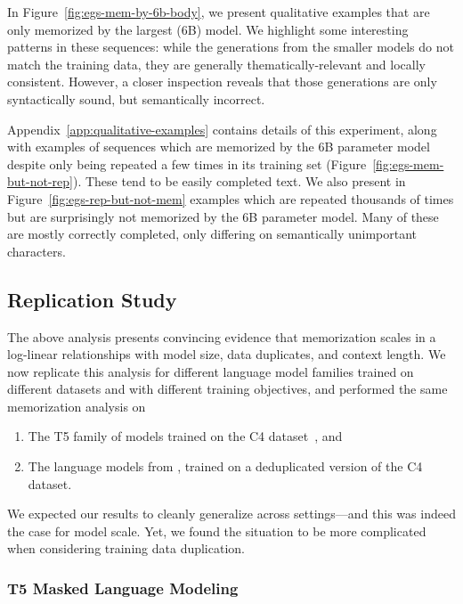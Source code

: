 In Figure~\ref{fig:egs-mem-by-6b-body}, we present qualitative examples that are only memorized by the largest (6B) model. We highlight some interesting patterns in these sequences: while the generations from the smaller models do not match the training data, they are generally thematically-relevant and locally consistent. However, a closer inspection reveals that those generations are only syntactically sound, but semantically incorrect.


Appendix~\ref{app:qualitative-examples} contains details of this experiment, along with examples of sequences which are memorized by the 6B parameter model despite only being repeated a few times in its training set (Figure~\ref{fig:egs-mem-but-not-rep}). These tend to be easily completed text. We also present in Figure~\ref{fig:egs-rep-but-not-mem} examples which are repeated thousands of times but are surprisingly not memorized by the 6B parameter model. Many of these are mostly correctly completed, only differing on semantically unimportant characters.

\subsection{Replication Study}

The above analysis presents convincing evidence that memorization scales in a log-linear relationships with model size, data duplicates, and context length.
%
We now replicate this analysis for different language model families trained on different datasets
and with different training objectives, and performed the same memorization analysis on
\begin{enumerate}[noitemsep,topsep=0pt]
\item The T5 family of models trained on the C4 dataset~\citep{t52020}, and
\item The language models from \citet{2021dedup}, trained on a deduplicated version of the C4 dataset.
\end{enumerate}
%
We expected our results to cleanly generalize across settings---and this was indeed the case for model scale. Yet, we found the situation to be more complicated when considering training data duplication.

\subsubsection{T5 Masked Language Modeling}

